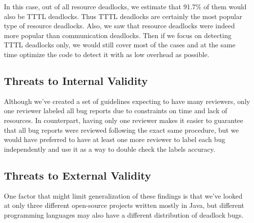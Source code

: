 In this case, out of all resource deadlocks, we estimate that 91.7\% of them would also be TTTL deadlocks. Thus TTTL deadlocks are certainly the most popular type of resource deadlocks. Also, we saw that resource deadlocks were indeed more popular than communication deadlocks. Then if we focus on detecting TTTL deadlocks only, we would still cover most of the cases and at the same time optimize the code to detect it with as low overhead as possible.

\subsection{Threats to Internal Validity}

Although we've created a set of guidelines expecting to have many reviewers, only one reviewer labeled all bug reports due to constraints on time and lack of resources.
In counterpart, having only one reviewer makes it easier to guarantee that all bug reports were reviewed following the exact same procedure, but we would have preferred to have at least one more reviewer to label each bug independently and use it as a way to double check the labels accuracy.

\subsection{Threats to External Validity}

One factor that might limit generalization of these findings is that we've looked at only three different open-source projects written mostly in Java, but different programming languages may also have a different distribution of deadlock bugs.
